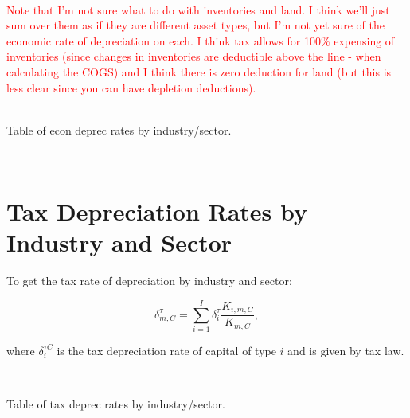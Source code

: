 \documentclass[article,11pt,letterpaper,fleqn]{article}
\theoremstyle{definition}
\numberwithin{equation}{section}
\begin{document}
\ \\
\textcolor{red}{Note that I'm not sure what to do with inventories and land.  I think we'll just sum over them as if they are different asset types, but I'm not yet sure of the economic rate of depreciation on each.  I think tax allows for 100\% expensing of inventories (since changes in inventories are deductible above the line - when calculating the COGS) and I think there is zero deduction for land (but this is less clear since you can have depletion deductions).}
\ \\

\ \\
\begin{center}
Table of econ deprec rates by industry/sector.
\end{center}
\ \\


\section{Tax Depreciation Rates by Industry and Sector}
\label{sec:tax_rates_sector}

 To get the  tax rate of depreciation by industry and sector: 

\begin{equation}
\label{eqn:tax_deprec}
\delta^{\tau}_{m,C}=\sum_{i=1}^{I}\delta^{\tau}_{i}\frac{K_{i,m,C}}{K_{m,C}},
\end{equation}

\noindent\noindent where $\delta^{\tau C}_{i}$ is the tax depreciation rate  of capital of type $i$ and is given by tax law.

\ \\
\begin{center}
Table of tax deprec rates by industry/sector.
\end{center}
\ \\



\end{document}
